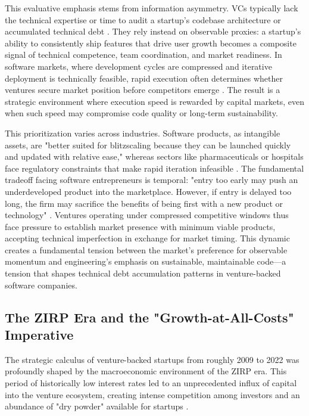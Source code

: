 This evaluative emphasis stems from information asymmetry. \ac{VC}s typically lack the technical expertise or time to audit a startup's codebase architecture or accumulated technical debt \citep{levesque2000effects}. They rely instead on observable proxies: a startup's ability to consistently ship features that drive user growth becomes a composite signal of technical competence, team coordination, and market readiness. In software markets, where development cycles are compressed and iterative deployment is technically feasible, rapid execution often determines whether ventures secure market position before competitors emerge \citep{levesque2000effects}. The result is a strategic environment where execution speed is rewarded by capital markets, even when such speed may compromise code quality or long-term sustainability.

This prioritization varies across industries. Software products, as intangible assets, are "better suited for blitzscaling because they can be launched quickly and updated with relative ease," whereas sectors like pharmaceuticals or hospitals face regulatory constraints that make rapid iteration infeasible \citep{kuratko2020blitzscaling}. The fundamental tradeoff facing software entrepreneurs is temporal: "entry too early may push an underdeveloped product into the marketplace. However, if entry is delayed too long, the firm may sacrifice the benefits of being first with a new product or technology" \citep{levesque2000effects}. Ventures operating under compressed competitive windows thus face pressure to establish market presence with minimum viable products, accepting technical imperfection in exchange for market timing. This dynamic creates a fundamental tension between the market's preference for observable momentum and engineering's emphasis on sustainable, maintainable code—a tension that shapes technical debt accumulation patterns in venture-backed software companies.

\subsection{The ZIRP Era and the "Growth-at-All-Costs" Imperative}

The strategic calculus of venture-backed startups from roughly 2009 to 2022 was profoundly shaped by the macroeconomic environment of the \ac{ZIRP} era. This period of historically low interest rates led to an unprecedented influx of capital into the venture ecosystem, creating intense competition among investors and an abundance of "dry powder" available for startups \citep{ning2015driving, kuratko2020blitzscaling}.

